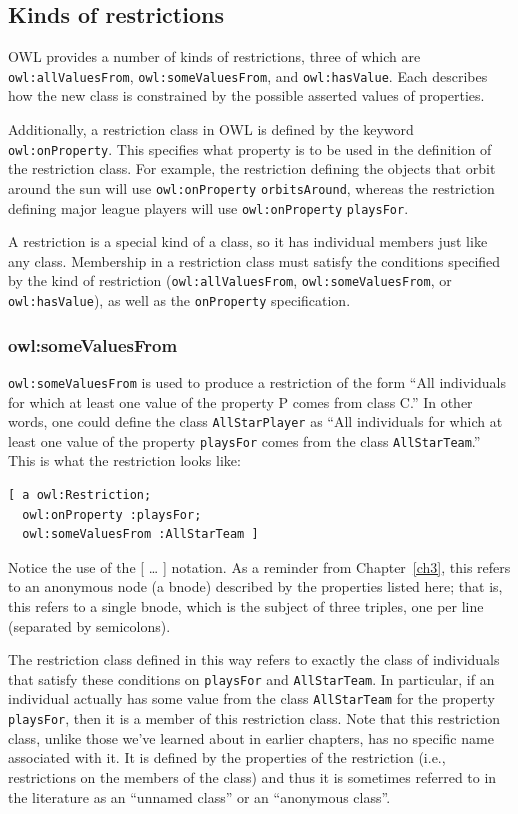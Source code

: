\subsection{Kinds of restrictions}
\label{ch12.restriction}
OWL provides a number of kinds of restrictions, three of which are
\texttt{owl:allValuesFrom}, \texttt{owl:someValuesFrom}, and \texttt{owl:hasValue}. Each describes
how the new class is constrained by the possible asserted values of
properties.

Additionally, a restriction class in OWL is defined by the keyword
\texttt{owl:onProperty}. This specifies what property is to be used in the
definition of the restriction class. For example, the restriction
defining the objects that orbit around the sun will use \texttt{owl:onProperty}
\texttt{orbitsAround}, whereas the restriction defining major league players will
use \texttt{owl:onProperty} \texttt{playsFor}.

A restriction is a special kind of a class, so it has individual members
just like any class.
Membership in a restriction class must satisfy the conditions specified
by the kind of restriction (\texttt{owl:allValuesFrom}, \texttt{owl:someValuesFrom}, or
\texttt{owl:hasValue}), as well as the \texttt{onProperty} specification.

\subsubsection{owl:someValuesFrom}
\label{ch12.somevaluesfrom}
\texttt{owl:someValuesFrom} is used to produce a restriction of the form ``All
individuals for which at least one value of the property P comes from
class C.'' In other words, one could define the class
\texttt{AllStarPlayer} as ``All individuals for which at least one value of the
property \texttt{playsFor} comes from the class \texttt{AllStarTeam}.'' This is what the
restriction looks like:

\begin{lstlisting}
[ a owl:Restriction;
  owl:onProperty :playsFor; 
  owl:someValuesFrom :AllStarTeam ]
\end{lstlisting}

Notice the use of the {[} \ldots{} {]} notation. As a reminder from
Chapter~\ref{ch3}, this refers to an anonymous node (a bnode) described by the
properties listed here; that is, this refers to a single bnode, which is
the subject of three triples, one per line (separated by semicolons).

The restriction class defined in this way refers to exactly the class of
individuals that satisfy these conditions on \texttt{playsFor} and \texttt{AllStarTeam}.
In particular, if an individual actually has some value from the class
\texttt{AllStarTeam} for the property \texttt{playsFor}, then it is a member of this
restriction class. Note that this restriction class, unlike those we've
learned about in earlier chapters, has no specific name associated with
it. It is defined by the properties of the restriction (i.e.,
restrictions on the members of the class) and thus it is sometimes
referred to in the literature as an ``unnamed class'' or an ``anonymous class''.

